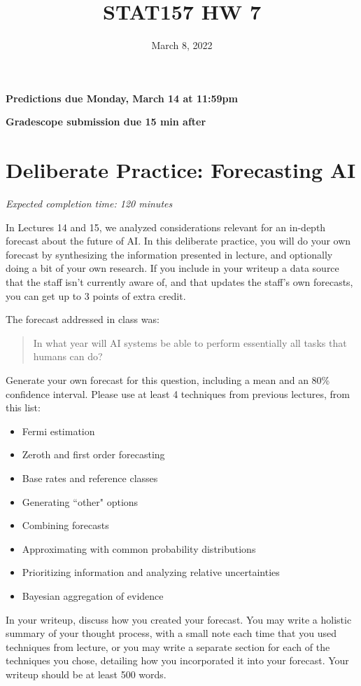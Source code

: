 \documentclass[11pt]{article}
\title{STAT157 HW 7}
\date{March 8, 2022}
\begin{document}
\maketitle

\hfill \textbf{Predictions due Monday, March 14 at 11:59pm}

\hfill \textbf{Gradescope submission due 15 min after}


\section*{Deliberate Practice: Forecasting AI}

\emph{Expected completion time: 120 minutes}

In Lectures 14 and 15, we analyzed considerations relevant for an in-depth forecast about the future of AI. In this deliberate practice, you will do your own forecast by synthesizing the information presented in lecture, and optionally doing a bit of your own research. If you include in your writeup a data source that the staff isn't currently aware of, and that updates the staff's own forecasts, you can get up to 3 points of extra credit.


The forecast addressed in class was:
\begin{quote}
	In what year will AI systems be able to perform essentially all tasks that humans can do?
\end{quote}
Generate your own forecast for this question, including a mean and an 80\% confidence interval. Please use at least 4 techniques from previous lectures, from this list:
\begin{itemize}
	\item Fermi estimation
	\item Zeroth and first order forecasting
	\item Base rates and reference classes
	\item Generating ``other" options
	\item Combining forecasts
	\item Approximating with common probability distributions
	\item Prioritizing information and analyzing relative uncertainties
	\item Bayesian aggregation of evidence
\end{itemize}

In your writeup, discuss how you created your forecast. You may write a holistic summary of your thought process, with a small note each time that you used techniques from lecture, or you may write a separate section for each of the techniques you chose, detailing how you incorporated it into your forecast. Your writeup should be at least 500 words.
\end{document}
